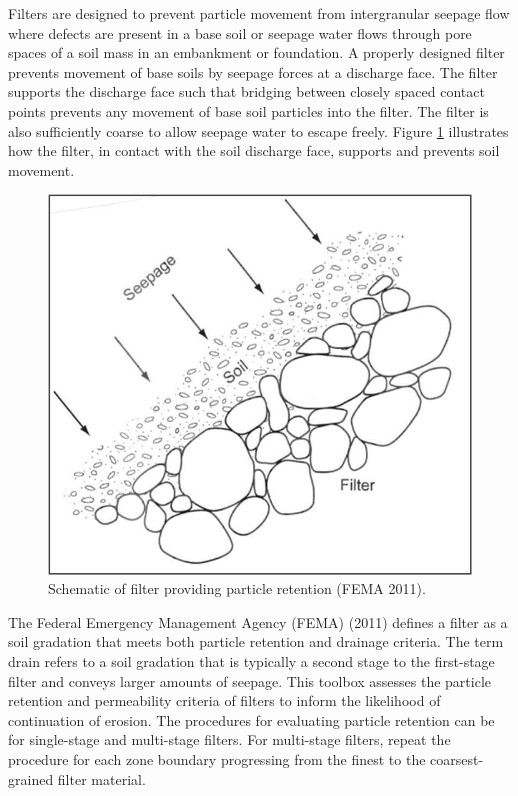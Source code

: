 \documentclass[
]{book}
\begin{document}
Filters are designed to prevent particle movement from intergranular seepage flow where defects are present in a base soil or seepage water flows through pore spaces of a soil mass in an embankment or foundation. A properly designed filter prevents movement of base soils by seepage forces at a discharge face. The filter supports the discharge face such that bridging between closely spaced contact points prevents any movement of base soil particles into the filter. The filter is also sufficiently coarse to allow seepage water to escape freely. Figure \ref{fig:figure-8} illustrates how the filter, in contact with the soil discharge face, supports and prevents soil movement.

\begin{figure}

{\centering \includegraphics[width=1\linewidth]{images/figure8} 

}

\caption{Schematic of filter providing particle retention (FEMA 2011).}\label{fig:figure-8}
\end{figure}

The Federal Emergency Management Agency (FEMA) (2011) defines a filter as a soil gradation that meets both particle retention and drainage criteria. The term drain refers to a soil gradation that is typically a second stage to the first-stage filter and conveys larger amounts of seepage. This toolbox assesses the particle retention and permeability criteria of filters to inform the likelihood of continuation of erosion. The procedures for evaluating particle retention can be for single-stage and multi-stage filters. For multi-stage filters, repeat the procedure for each zone boundary progressing from the finest to the coarsest-grained filter material.
\end{document}
